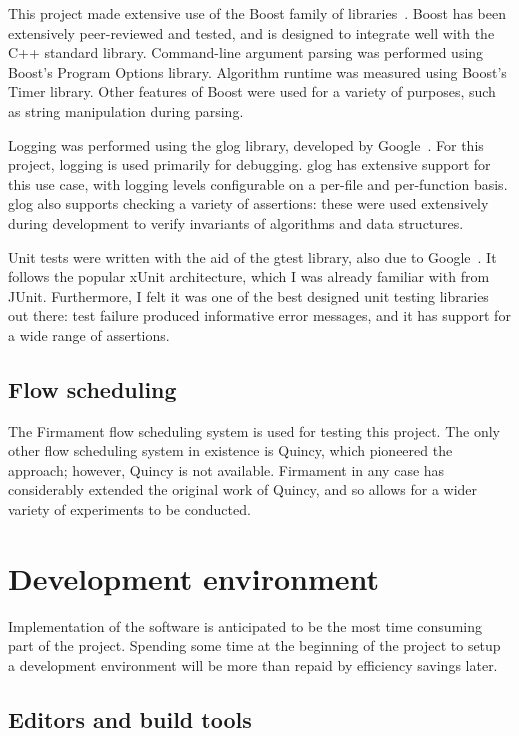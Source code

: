 This project made extensive use of the Boost family of libraries~\cite{Boost}. Boost has been extensively peer-reviewed and tested, and is designed to integrate well with the C++ standard library. Command-line argument parsing was performed using Boost's Program Options library. Algorithm runtime was measured using Boost's Timer library. Other features of Boost were used for a variety of purposes, such as string manipulation during parsing.

Logging was performed using the glog library, developed by Google~\cite{Glog}. For this project, logging is used primarily for debugging. glog has extensive support for this use case, with logging levels configurable on a per-file and per-function basis. glog also supports checking a variety of assertions: these were used extensively during development to verify invariants of algorithms and data structures.

Unit tests were written with the aid of the gtest library, also due to Google~\cite{Gtest}. It follows the popular xUnit architecture, which I was already familiar with from JUnit. Furthermore, I felt it was one of the best designed unit testing libraries out there: test failure produced informative error messages, and it has support for a wide range of assertions.

\subsection{Flow scheduling}

The Firmament flow scheduling system is used for testing this project. The only other flow scheduling system in existence is Quincy, which pioneered the approach; however, Quincy is not available. Firmament in any case has considerably extended the original work of Quincy, and so allows for a wider variety of experiments to be conducted.

\section{Development environment}

Implementation of the software is anticipated to be the most time consuming part of the project. Spending some time at the beginning of the project to setup a development environment will be more than repaid by efficiency savings later.

\subsection{Editors and build tools}

